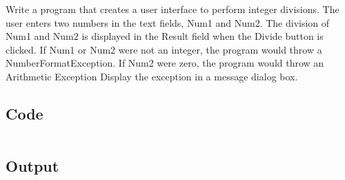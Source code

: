 \documentclass[../main.tex]{subfiles}
\begin{document}
Write a program that creates a user interface to perform integer divisions.
The user enters two numbers in the text fields, Num1 and Num2. The division of
Num1 and Num2 is displayed in the Result field when the Divide button is
clicked. If Num1 or Num2 were not an integer, the program would throw a
NumberFormatException. If Num2 were zero, the program would throw an Arithmetic
Exception Display the exception in a message dialog box.

\subsection{Code}
\inputminted[frame=lines, breaklines, breakanywhere, numberblanklines=false]{java}{./programs/prog16/Dialog.java}

\subsection{Output}
\end{document}
